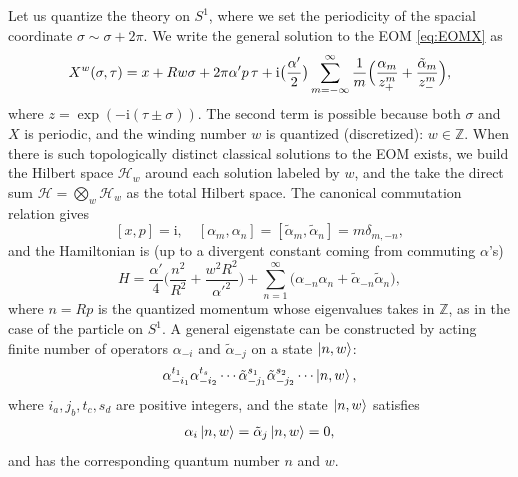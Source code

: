 \documentclass[
]{scrartcl}
\numberwithin{equation}{section}
\renewenvironment{align}{\begin{equation}\begin{aligned}}{\end{aligned}\end{equation}}
\theoremstyle{definition}
\theoremstyle{definition}
\theoremstyle{definition}
\theoremstyle{definition}
\theoremstyle{remark}
\begin{document}
Let us quantize the theory on \(S^1\), where we set the periodicity of the spacial coordinate \(\sigma \sim \sigma + 2\pi\).
We write the general solution to the EOM \eqref{eq:EOMX} as
\begin{equation}
    \label{eq:Xexp}
    X^w(\sigma,\tau) = x +  R w \sigma + 2\pi \alpha' p \, \tau + \mathrm{i}\bigl(\frac{\alpha'}{2}\bigr) \sum_{m = -\infty}^{\infty} \frac1m\Bigl(\frac{\alpha_m}{z^m_+}+\frac{\tilde\alpha_m}{z^m_-}\Bigr),
\end{equation}
where \(z = \exp(- \mathrm{i}(\tau \pm \sigma))\).
The second term is possible because both \(\sigma\) and \(X\) is periodic, and the winding number \(w\) is quantized (discretized): \(w\in \mathbb{Z}\).
When there is such topologically distinct classical solutions to the EOM exists, we build the Hilbert space \(\mathcal{H}_w\) around each solution labeled by \(w\), and the take the direct sum \(\mathcal{H} = \bigotimes_w \mathcal{H}_w\) as the total Hilbert space.
The canonical commutation relation gives
\begin{equation}
    \label{eq:comu}
    [x,p] = \mathrm{i}, \quad [\alpha_m,\alpha_n] = [\tilde{\alpha}_m,\tilde{\alpha}_n] = m \delta_{m,-n},
\end{equation}
and the Hamiltonian is (up to a divergent constant coming from commuting \(\alpha\)'s)
\begin{equation}
    \label{eq:HamXModes}
    H = \frac{\alpha'}{4} \bigl(\frac{n^2}{R^2}+\frac{w^2 R^2}{\alpha'^2}\bigr) + \sum_{n=1}^{\infty} \bigl(\alpha_{-n}\alpha_n + \tilde{\alpha}_{-n}\tilde{\alpha}_n\bigr),
\end{equation}
where \(n = R p\) is the quantized momentum whose eigenvalues takes in \(\mathbb{Z}\), as in the case of the particle on \(S^1\).
A general eigenstate can be constructed by acting finite number of operators \(\alpha_{-i}\) and \(\tilde{\alpha}_{-j}\) on a state \(\ket{n,w}\):
\begin{equation}
    \label{eq:eigen}
    \alpha_{-i_1}^{t_1}\alpha_{-i_2}^{t_s} \cdots 
    \tilde\alpha_{-j_1}^{s_1}\tilde\alpha_{-j_2}^{s_2} \cdots 
    \ket{n,w},
\end{equation}
where \(i_a,j_b,t_c,s_d\) are positive integers, and the state \(\ket{n,w}\) satisfies
\begin{align}
    \alpha_i \ket{n,w} = \tilde{\alpha}_j \ket{n,w} = 0,
\end{align}
and has the corresponding quantum number \(n\) and \(w\).
\end{document}
